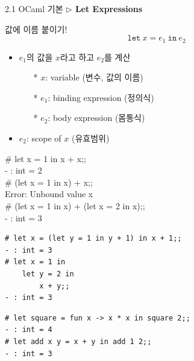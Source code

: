 \documentclass[10pt]{beamer}
\begin{document}
	\begin{frame}{2.1 OCaml 기본}
		\textbf{$\triangleright$ Let Expressions}
		
		값에 이름 붙이기! \[
		\texttt{let}\ x = e_1\ \texttt{in}\ e_2
		\]
		\begin{itemize}
			\item $e_1$의 값을 $x$라고 하고 $e_2$를 계산
			\begin{itemize}
				\item[*] $x$: variable (변수, 값의 이름)
				\item[*] $e_1$: binding expression (정의식)
				\item[*] $e_2$: body expression (몸통식)
			\end{itemize}
			\item $e_2$: scope of $x$ (유효범위)
		\end{itemize}
		 \begin{tcolorbox}[colback=backcolor]\ttfamily
			\# let x = 1 in x + x;;\\
			- : int = 2\\
			\# (let x = 1 in x) + x;;\\
			Error: Unbound value x\\
			\# (let x = 1 in x) + (let x = 2 in x);; \\
			- : int = 3
		\end{tcolorbox}	
		\begin{itemize}
			\item[] 
			\item[] 
			\item[] 
			\item[] 
			\item[] 
		\end{itemize}
	\end{frame}

\begin{lstlisting}[style=zsh]
# let x = (let y = 1 in y + 1) in x + 1;;
- : int = 3
# let x = 1 in
	let y = 2 in
		x + y;;
- : int = 3
\end{lstlisting}

\begin{lstlisting}[style=zsh]
# let square = fun x -> x * x in square 2;;
- : int = 4
# let add x y = x + y in add 1 2;;
- : int = 3
\end{lstlisting}
\end{document}
